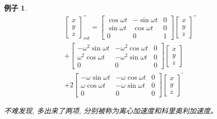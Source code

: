 \documentclass{ctexart}
\numberwithin{equation}{subsection}
\numberwithin{theorem}{subsection}
\numberwithin{definition}{subsection}
\numberwithin{proof}{subsection}
\numberwithin{lemma}{subsection}
\newtheorem{example}    {例子}
\numberwithin{example}{subsection}
\numberwithin{remark}{subsection}
\numberwithin{corollary}{subsection}
\numberwithin{exercise}{subsection}
\numberwithin{problem}{subsection}
\numberwithin{question}{section}
\numberwithin{method}{subsection}
\begin{document}
\begin{example}
        \begin{equation}
            \begin{split}
                \begin{bmatrix}
                    x \\
                    y \\
                    z
                \end{bmatrix}_{rot} ^ {\prime \prime}
                = \begin{bmatrix}
                    \cos \omega t & -\sin \omega t & 0 \\
                    \sin \omega t & \cos \omega t & 0 \\
                    0 & 0 & 1
                \end{bmatrix}
                \begin{bmatrix}
                    x \\
                    y \\
                    z
                \end{bmatrix} ^ {\prime \prime} \\ 
                + \begin{bmatrix}
                    -\omega^2 \sin \omega t & -\omega^2 \cos \omega t & 0 \\
                    \omega^2 \cos \omega t & -\omega^2 \sin \omega t & 0 \\
                    0 & 0 & 0
                \end{bmatrix}
                \begin{bmatrix}
                    x \\
                    y \\
                    z
                \end{bmatrix} \\
                + 2 \begin{bmatrix}
                    -\omega \sin \omega t & -\omega \cos \omega t & 0 \\
                    \omega \cos \omega t & -\omega \sin \omega t & 0 \\
                    0 & 0 & 0
                \end{bmatrix}
                \begin{bmatrix}
                    x \\
                    y \\
                    z
                \end{bmatrix} ^ {\prime}
            \end{split}
        \end{equation}

        不难发现, 多出来了两项, 分别被称为离心加速度和科里奥利加速度。
    \end{example}
\end{document}
